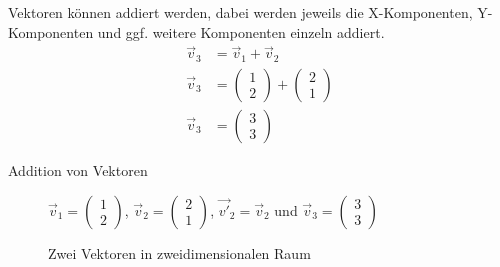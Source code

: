 \documentclass[aspectratio=169, ignorenonframetext]{beamer}
\begin{document}
Vektoren können addiert werden, dabei werden jeweils die X-Komponenten, Y-Komponenten und ggf. weitere Komponenten einzeln addiert.
\begin{align}
  \vec{v}_3 &= \vec{v}_1 + \vec{v}_2\\
  \vec{v}_3 &= \left(\begin{array}{c} 1 \\ 2 \end{array}\right) + \left(\begin{array}{c} 2 \\ 1 \end{array}\right)\\
  \vec{v}_3 &= \left(\begin{array}{c} 3 \\ 3 \end{array}\right)
\end{align}

\begin{frame}{Addition von Vektoren}
  \begin{figure}[htb]

    $\vec{v}_1= \left(\begin{array}{c} 1 \\ 2 \end{array}\right)$, $\vec{v}_2= \left(\begin{array}{c} 2 \\ 1 \end{array}\right)$, $\vec{v'}_2 = \vec{v}_2$  und $\vec{v}_3= \left(\begin{array}{c} 3 \\ 3 \end{array}\right)$
    \caption{Zwei Vektoren in zweidimensionalen Raum}
    \label{fig:ZweiVektorenAddiert}
  \end{figure}
\end{frame}

\end{document}
